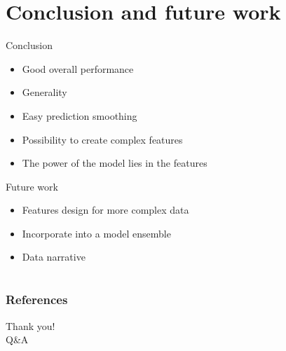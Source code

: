 \documentclass[10pt]{beamer}
\begin{document}
\section{Conclusion and future work}
\begin{frame}

  \begin{block}{Conclusion}
    \begin{itemize}
      \item Good overall performance
      \item Generality
      \item Easy prediction smoothing
      \item Possibility to create complex features
      \item The power of the model lies in the features
    \end{itemize}
  \end{block}

  \begin{block}{Future work}
    \begin{itemize}
      \item Features design for more complex data
      \item Incorporate into a model ensemble
      \item Data narrative
    \end{itemize}
  \end{block}

\end{frame}




\section*{}%
  \begin{frame}
    \frametitle{References}
    
    
  \end{frame}

  \begin{frame}[plain]
    \centering
    \Huge Thank you!\\
    \Huge Q\&A \par
  \end{frame}
\end{document}
